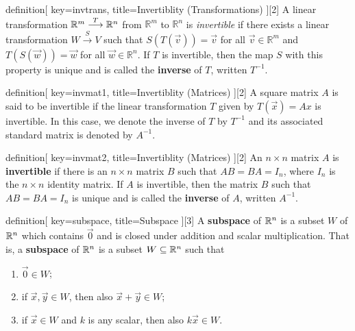 \begin{SaveConcept}{definition}[
		key=invtrans,
		title={Invertiblity (Transformations)}
	][2]
        A linear transformation $\mathbb{R}^m \overset{T}\longrightarrow \mathbb R^n$ from $\mathbb R^m$ to $\mathbb R^n$ is \emph{invertible} if there exists a linear transformation $W \overset{S}\longrightarrow V$ such that $S(T(\vec{v}))=\vec{v}$ for all $\vec{v}\in \mathbb R^m$ and $T(S(\vec{w}))=\vec{w}$ for all $\vec{w}\in \mathbb R^n$. If $T$ is invertible, then the map $S$ with this property is unique and is called the {\bf inverse} of $T$, written $T^{-1}$.
\end{SaveConcept}


\begin{SaveConcept}{definition}[
		key=invmat1,
		title={Invertiblity (Matrices)}
	][2]
        A square matrix $A$ is said to be invertible if the linear transformation $T$ given by $T (\vec x) = Ax$ is invertible. In this case, we denote the inverse of $T$ by $T^{-1}$ and its associated standard matrix is denoted by $A^{-1}$. 
\end{SaveConcept}


\begin{SaveConcept}{definition}[
		key=invmat2,
		title={Invertiblity (Matrices)}
	][2]
        An $n\times n$ matrix $A$ is {\bf invertible} if there is an $n\times n$ matrix $B$ such that $AB=BA=I_n$, where $I_n$ is the $n\times n$ identity matrix. If $A$ is invertible, then the matrix $B$ such that $AB=BA=I_n$ is unique and is called the {\bf inverse} of $A$, written $A^{-1}$.
\end{SaveConcept}






\begin{SaveConcept}{definition}[
		key=subspace,
		title={Subspace}
	][3]
        A {\bf subspace} of $\mathbb{R}^n$ is a subset $W$ of $\mathbb{R}^n$ which contains $\vec{0}$ and is closed under addition and scalar multiplication. That is, a {\bf subspace} of $\mathbb{R}^n$ is a subset $W\subseteq \mathbb{R}^n$ such that 
        \begin{enumerate}
            \item $\vec{0}\in W$;
            \item if $\vec x, \vec y \in W$, then also $\vec x + \vec y \in W$;
            \item if $\vec x  \in W$ and $k$ is any scalar, then  also $k\vec x \in W$.
        \end{enumerate}
\end{SaveConcept}


